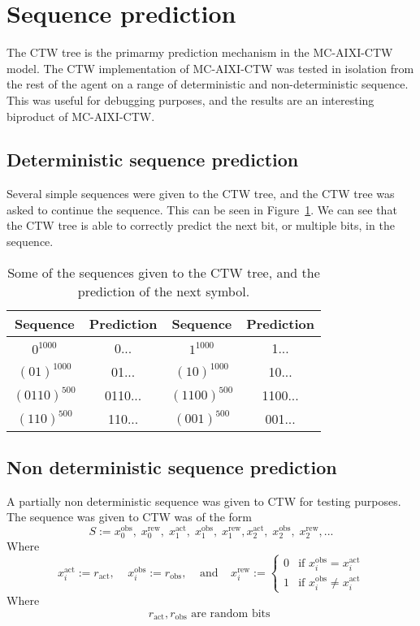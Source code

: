 \documentclass[pdftex,twoside,a4paper]{report}
\newcommand{\bcen}{\begin{center}}
\newcommand{\ecen}{\end{center}}
\newcommand{\mac}{MC-AIXI-CTW}
\begin{document}
\section{Sequence prediction}
\label{sec:Sequence prediction}
The CTW tree is the primarmy prediction mechanism in the \mac{} model. The CTW implementation of \mac{} was tested in isolation from the rest of the agent on a range of deterministic and non-deterministic sequence. This was useful for debugging purposes, and the results are an interesting biproduct of \mac{}.
\subsection{Deterministic sequence prediction}
Several simple sequences were given to the CTW tree, and the CTW tree was asked to continue the sequence. This can be seen in Figure~\ref{tab:det_seq_pred}. We can see that the CTW tree is able to correctly predict the next bit, or multiple bits, in the sequence.

\begin{table}
\bcen
\bgroup
\def\arraystretch{1.5}
\begin{tabular}{|cc|cc|}
\hline
Sequence & Prediction & Sequence & Prediction\\
\hline $0^{1000}$ & 0... & $1^{1000}$ & 1...\\ 
\hline $(01)^{1000}$ & 01... & $(10)^{1000}$ & 10...\\ 
\hline $(0110)^{500}$ & 0110... & $(1100)^{500}$ & 1100...\\ 
\hline $(110)^{500}$ & 110... & $(001)^{500}$ & 001...\\
\hline 
\end{tabular} 
\egroup
\ecen
\caption{Some of the sequences given to the CTW tree, and the prediction of the next symbol.}
\label{tab:det_seq_pred}
\end{table}

\subsection{Non deterministic sequence prediction}
A partially non deterministic sequence was given to CTW for testing purposes. The sequence was given to CTW was of the form\\
\[
S := x^{\text{obs}}_0,\; x^{\text{rew}}_0,\; x^{\text{act}}_1,\; x^{\text{obs}}_1,\; x^{\text{rew}}_1, x^{\text{act}}_2,\; x^{\text{obs}}_2,\; x^{\text{rew}}_2, ...
\]
Where\\
\[
x^{\text{act}}_i := r_{\text{act}}, \;\;\;\; x^{\text{obs}}_i := r_{\text{obs}}, \;\;\;\; \text{and} \;\;\;\;
x^{\text{rew}}_i :=
\begin{cases}
0 & \text{if } x^{\text{obs}}_i = x^{\text{act}}_i\\
1 & \text{if } x^{\text{obs}}_i \not= x^{\text{act}}_i
\end{cases}
\]
Where\\
\[
r_\text{act}, r_\text{obs} \text{ are random bits }
\]
\end{document}
